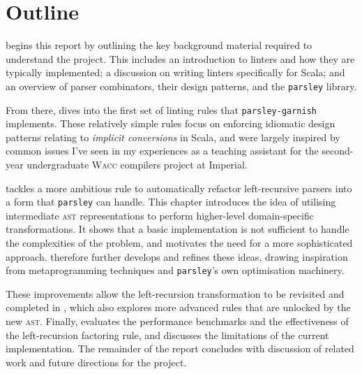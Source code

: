 \documentclass[../../main.tex]{subfiles}
\begin{document}
\section*{Outline}
 begins this report by outlining the key background material required to understand the project.
This includes an introduction to linters and how they are typically implemented; a discussion on writing linters specifically for Scala; and an overview of parser combinators, their design patterns, and the \texttt{parsley} library.

From there,  dives into the first set of linting rules that \texttt{parsley-garnish} implements.
These relatively simple rules focus on enforcing idiomatic design patterns relating to \emph{implicit conversions} in Scala, and were largely inspired by common issues I've seen in my experiences as a teaching assistant for the second-year undergraduate \textsc{Wacc} compilers project at Imperial.

 tackles a more ambitious rule to automatically refactor left-recursive parsers into a form that \texttt{parsley} can handle.
This chapter introduces the idea of utilising intermediate \textsc{ast} representations to perform higher-level domain-specific transformations.
It shows that a basic implementation is not sufficient to handle the complexities of the problem, and motivates the need for a more sophisticated approach.
 therefore further develops and refines these ideas, drawing inspiration from metaprogramming techniques and \texttt{parsley}'s own optimisation machinery.

These improvements allow the left-recursion transformation to be revisited and completed in , which also explores more advanced rules that are unlocked by the new \textsc{ast}.
Finally,  evaluates the performance benchmarks and the effectiveness of the left-recursion factoring rule, and discusses the limitations of the current implementation.
The remainder of the report concludes with discussion of related work and future directions for the project.
\end{document}
